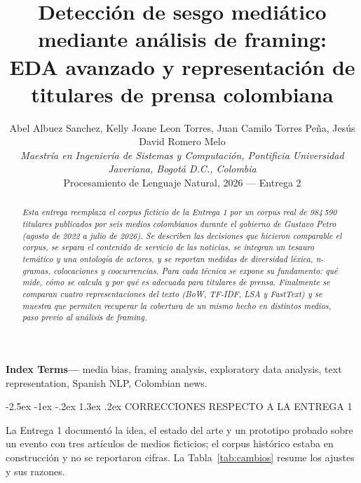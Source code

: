 \documentclass[10pt,twocolumn]{article}
\title{\textbf{Detección de sesgo mediático mediante análisis de framing:\\
EDA avanzado y representación de titulares de prensa colombiana}}
\author{Abel Albuez Sanchez, Kelly Joane Leon Torres, Juan Camilo Torres Peña, Jesús David Romero Melo\\
\small\textit{Maestría en Ingeniería de Sistemas y Computación, Pontificia Universidad Javeriana, Bogotá D.C., Colombia}\\
\small Procesamiento de Lenguaje Natural, 2026 --- Entrega 2}
\date{}
\makeatletter
\renewcommand{\section}{\@startsection{section}{1}{\z@}%
  {-2.5ex \@plus -1ex \@minus -.2ex}%
  {1.3ex \@plus .2ex}%
  {\normalfont\large\bfseries\centering}}
\makeatother
\begin{document}
\maketitle
\begin{abstract}
\textit{Esta entrega reemplaza el corpus ficticio de la Entrega 1 por un corpus
real de 984\,590 titulares publicados por seis medios colombianos durante el
gobierno de Gustavo Petro (agosto de 2022 a julio de 2026). Se describen las
decisiones que hicieron comparable el corpus, se separa el contenido de
servicio de las noticias, se integran un tesauro temático y una ontología de
actores, y se reportan medidas de diversidad léxica, n-gramas, colocaciones y
coocurrencias. Para cada técnica se expone su fundamento: qué mide, cómo se
calcula y por qué es adecuada para titulares de prensa. Finalmente se comparan cuatro representaciones del texto
(BoW, TF-IDF, LSA y FastText) y se muestra que permiten recuperar la cobertura
de un mismo hecho en distintos medios, paso previo al análisis de framing.}
\end{abstract}

\noindent\textbf{Index Terms---} media bias, framing analysis, exploratory data
analysis, text representation, Spanish NLP, Colombian news.

\section{CORRECCIONES RESPECTO A LA ENTREGA 1}

La Entrega 1 documentó la idea, el estado del arte y un prototipo probado sobre
un evento con tres artículos de medios ficticios; el corpus histórico estaba en
construcción y no se reportaron cifras. La Tabla~\ref{tab:cambios} resume los
ajustes y sus razones.
\end{document}
